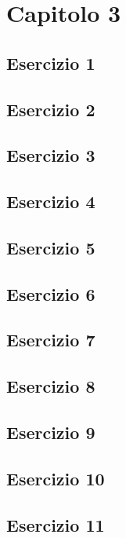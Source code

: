 \section{\textbf{Capitolo 3}}
\subsection{Esercizio 1}

\newpage
\subsection{Esercizio 2}

\newpage
\subsection{Esercizio 3}

\newpage
\subsection{Esercizio 4}

\newpage
\subsection{Esercizio 5}

\newpage
\subsection{Esercizio 6}

\newpage
\subsection{Esercizio 7}

\newpage
\subsection{Esercizio 8}

\newpage
\subsection{Esercizio 9}

\newpage
\subsection{Esercizio 10}

\newpage
\subsection{Esercizio 11}

\newpage